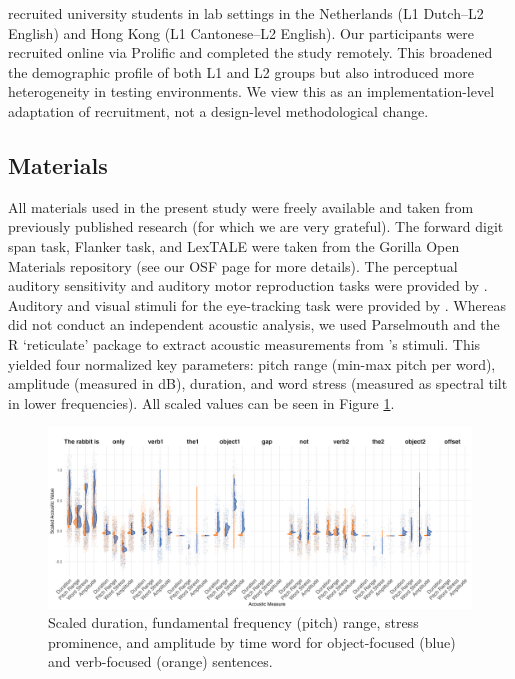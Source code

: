 \textcite{ge2021a} recruited university students in lab settings in the Netherlands (L1 Dutch–L2 English) and Hong Kong (L1 Cantonese–L2 English). Our participants were recruited online via Prolific and completed the study remotely. This broadened the demographic profile of both L1 and L2 groups but also introduced more heterogeneity in testing environments. We view this as an implementation-level adaptation of recruitment, not a design-level methodological change.

\subsection{Materials}
All materials used in the present study were freely available and taken from previously published research (for which we are very grateful). The forward digit span task, Flanker task, and LexTALE \parencite{lemhofer2012introducing} were taken from the Gorilla \parencite{Anwyl-Irvine_2019} Open Materials repository (see our OSF page for more details). The perceptual auditory sensitivity and auditory motor reproduction tasks were provided by \textcite{Kachlicka_Saito_Tierney_2019, saito2020domain}. Auditory and visual stimuli for the eye-tracking task were provided by \textcite{ge2021a}. Whereas \textcite{ge2021a} did not conduct an independent acoustic analysis, we used  Parselmouth \parencite{jadoul2018introducing} and the R `reticulate' package \parencite{Ushey2022} to extract acoustic measurements from \textcite{ge2021a}'s stimuli. This yielded four normalized key parameters: pitch range (min-max pitch per word), amplitude (measured in dB), duration, and word stress (measured as spectral tilt in lower frequencies). All scaled values can be seen in Figure \ref{fig:acoustic_faceted}.

\begin{figure}[H]  %
    \centering
    \includegraphics[width=\textwidth,height=\textheight,keepaspectratio]{viz/acoustic_faceted.png}
    \caption{Scaled duration, fundamental frequency (pitch) range, stress prominence, and amplitude by time word for object-focused (blue) and verb-focused (orange) sentences.}
    \label{fig:acoustic_faceted}
\end{figure}


